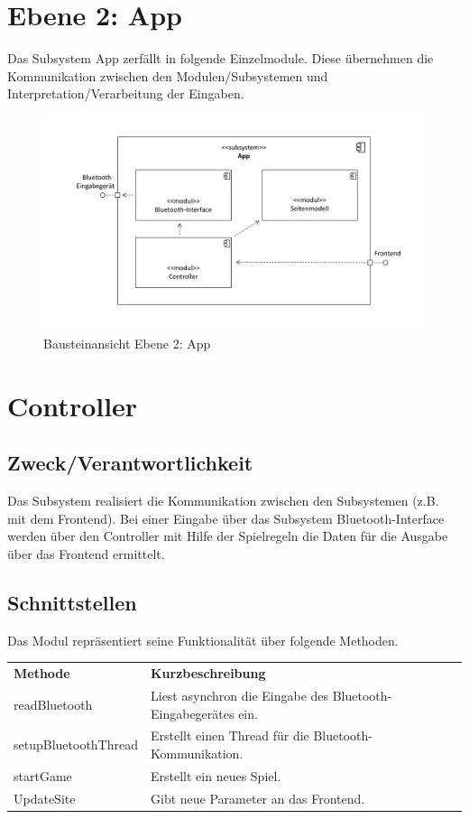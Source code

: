 \newpage

\section{Ebene 2: App}
\label{sec:App}
Das Subsystem App zerfällt in folgende Einzelmodule. Diese übernehmen die Kommunikation zwischen den Modulen/Subsystemen und Interpretation/Verarbeitung der Eingaben.

\begin{figure}[H]
\begin{center}
\includegraphics[scale=0.5]{Grafiken/Baustein_2.pdf}
\caption{Bausteinansicht Ebene 2: App}
\end{center}
\end{figure}

\section{Controller}
\subsection*{Zweck/Verantwortlichkeit}
Das Subsystem realisiert die Kommunikation zwischen den Subsystemen (z.B. mit dem Frontend). Bei einer Eingabe über das Subsystem Bluetooth-Interface werden über den Controller mit Hilfe der Spielregeln die Daten für die Ausgabe über das Frontend ermittelt.
\subsection*{Schnittstellen}
Das Modul repräsentiert seine Funktionalität über folgende Methoden.
\begin{center}
\begin{tabular}[h]{|l|l|}
\cline{1-2}
\textbf{Methode} & \textbf{Kurzbeschreibung}\\
\cline{1-2}
readBluetooth & Liest asynchron die Eingabe des Bluetooth-Eingabegerätes ein.\\ 
\cline{1-2}
setupBluetoothThread & Erstellt einen Thread für die Bluetooth-Kommunikation.\\
\cline{1-2}
startGame & Erstellt ein neues Spiel.\\
\cline{1-2}
UpdateSite & Gibt neue Parameter an das Frontend.\\
\cline{1-2} 
\end{tabular}
\end{center}
